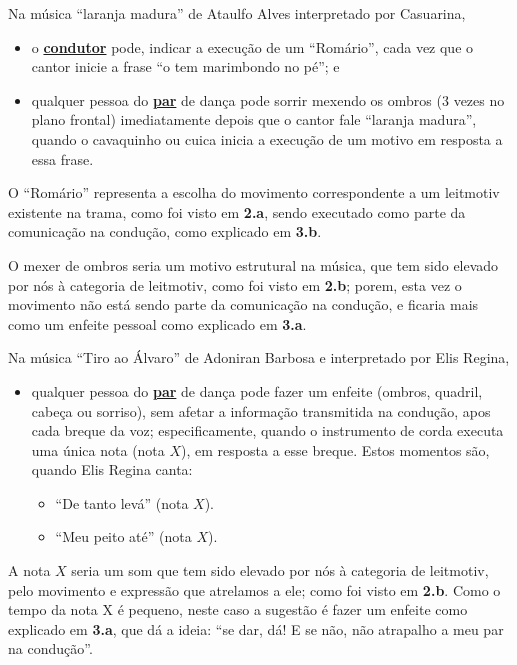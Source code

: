\begin{example}
Na música ``laranja madura'' de Ataulfo Alves interpretado por Casuarina,
\begin{itemize}
\item  o \hyperref[def:Condutor]{\textbf{condutor}} pode, indicar a execução de um ``Romário'',
cada vez que o cantor inicie a frase ``o tem marimbondo no pé''; 
e 
\item qualquer pessoa do \hyperref[def:Par]{\textbf{par}} de dança pode sorrir 
mexendo os ombros (3 vezes no plano frontal) imediatamente depois que o cantor fale ``laranja madura'',
quando o cavaquinho ou cuica inicia a execução de um motivo em resposta a essa frase.
\end{itemize}

O ``Romário'' representa a escolha do movimento correspondente a um leitmotiv existente na trama,
como foi visto em \textbf{2.a}, sendo executado como parte da comunicação na condução, como explicado em \textbf{3.b}.

O mexer de ombros seria um motivo estrutural na música, que tem sido elevado por nós à categoria de leitmotiv,
como foi visto em \textbf{2.b}; porem, esta vez o movimento não está sendo parte da comunicação na condução,
e ficaria mais como um enfeite pessoal como explicado em \textbf{3.a}.

\end{example}

\begin{example}
\label{ex:leitmotiftiroalvaro}
Na música ``Tiro ao Álvaro'' de Adoniran Barbosa e interpretado  por Elis Regina,
\begin{itemize}
\item qualquer pessoa do \hyperref[def:Par]{\textbf{par}} de dança pode fazer um enfeite (ombros, quadril, cabeça ou sorriso),
sem afetar a informação transmitida na condução, apos cada breque da voz;
especificamente, quando o instrumento de corda executa uma única nota (nota $X$), em resposta a esse breque.
Estos momentos são, quando Elis Regina canta: 
\begin{itemize}
\item ``De tanto levá'' (nota $X$).
\item ``Meu peito até'' (nota $X$).
\end{itemize}
\end{itemize}
A nota $X$ seria um som que tem sido elevado por nós à categoria de leitmotiv,
pelo movimento e expressão que atrelamos a ele;
como foi visto em \textbf{2.b}. 
Como o tempo da nota X é pequeno, neste caso a sugestão é fazer um enfeite como explicado em \textbf{3.a},
que dá a ideia: ``se dar, dá! E se não, não atrapalho a meu par na condução''.

\end{example}


